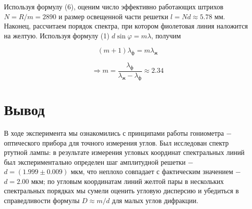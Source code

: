 \documentclass[a4paper,12pt]{article} %
\begin{document}
\hfill \break Используя формулу (6), оценим число эффективно работающих штрихов $N = R/m = 2890$ и размер освещенной части решетки $l = Nd \approx 5.78 $ мм. Наконец, рассчитаем порядок спектра, при котором фиолетовая линия наложится на желтую. Используя формулу (1) $d\sin{\varphi} = m\lambda$, получим

$$
(m + 1) \lambda_{\text{ф}} = m\lambda_{\text{ж}}
$$

$$
\Rightarrow m = \frac{\lambda_{\text{ф}}}{\lambda_{\text{ж}} - \lambda_{\text{ф}}} \approx 2.34
$$

\section{Вывод}
\hfill \break В ходе эксперимента мы ознакомились с принципами работы гониометра $-$ оптического прибора для точного измерения углов. Был исследован спектр ртутной лампы: в результате измерения угловых координат спектральных линий был экспериментально определен шаг амплитудной решетки $-$ $d = (1.999 \pm 0.009)$ мкм, что неплохо совпадает с фактическим значением $-$ $d = 2.00$ мкм; по угловым координатам линий желтой пары в нескольких спектральных порядках мы сумели оценить угловую дисперсию и убедиться в справедливости формулы $D \approx m/d$ для малых углов дифракции.
\end{document}
